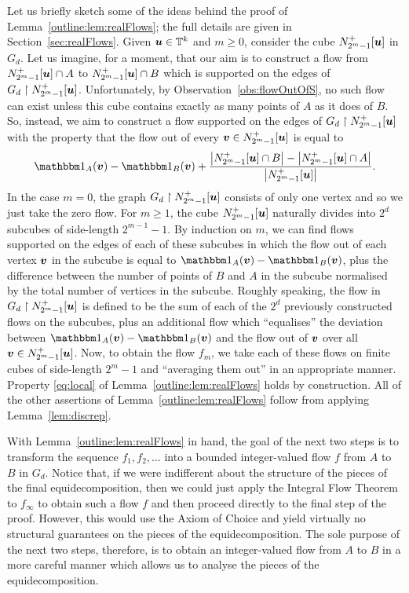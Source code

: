 \documentclass[12pt,a4paper]{amsart}
\numberwithin{equation}{section}
\theoremstyle{definition}
\begin{document}
Let us briefly sketch some of the ideas behind the proof of Lemma~\ref{outline:lem:realFlows}; the full details are given in Section~\ref{sec:realFlows}. Given $\boldsymbol{u}\in\mathbb{T}^k$ and $m\geq0$, consider the cube $N_{2^m-1}^+[\boldsymbol{u}]$ in $G_d$. Let us imagine, for a moment, that our aim is to construct a flow from $N_{2^m-1}^+[\boldsymbol{u}]\cap A$ to $N_{2^m-1}^+[\boldsymbol{u}]\cap B$ which is supported on the edges of $G_d\upharpoonright N_{2^m-1}^+[\boldsymbol{u}]$.  Unfortunately, by Observation~\ref{obs:flowOutOfS}, no such flow can exist unless this cube contains exactly as many points of $A$ as it does of $B$. So, instead, we aim to construct a flow supported on the edges of $G_d\upharpoonright N_{2^m-1}^+[\boldsymbol{u}]$ with the property that the flow out of every $\boldsymbol{v}\in N_{2^m-1}^+[\boldsymbol{u}]$ is equal to
\[\ind_A(\vvec{v}) - \ind_B(\vvec{v}) + \frac{\left|N_{2^m-1}^+[\vvec{u}]\cap B\right|-\left|N_{2^m-1}^+[\vvec{u}]\cap A\right|}{\left|N_{2^m-1}^+[\vvec{u}]\right|}.\] 
In the case $m=0$, the graph $G_d\upharpoonright N_{2^{m}-1}^+[\boldsymbol{u}]$ consists of only one vertex and so we just take the zero flow. For $m\geq1$, the cube $N^+_{2^m-1}[\boldsymbol{u}]$ naturally divides into $2^d$ subcubes of side-length $2^{m-1}-1$. By induction on $m$, we can find flows supported on the edges of each of these subcubes in which the flow out of each vertex $\boldsymbol{v}$ in the subcube is equal to $\ind_A(\vvec{v})-\ind_B(\vvec{v})$, plus the difference between the number of points of $B$ and $A$ in the subcube normalised by the total number of vertices in the subcube. Roughly speaking, the flow in $G_d\upharpoonright N^+_{2^m-1}[\boldsymbol{u}]$ is defined to be the sum of each of the $2^d$ previously constructed flows on the subcubes, plus an additional flow which ``equalises'' the deviation between $\ind_A(\vvec{v})-\ind_B(\vvec{v})$ and the flow out of $\boldsymbol{v}$ over all $\boldsymbol{v}\in N^+_{2^m-1}[\boldsymbol{u}]$. Now, to obtain the flow $f_m$, we take each of these flows on finite cubes of side-length $2^m-1$ and ``averaging them out'' in an appropriate manner. Property \eqref{eq:local} of Lemma~\ref{outline:lem:realFlows} holds by construction. All of the other assertions of Lemma~\ref{outline:lem:realFlows} follow from applying Lemma~\ref{lem:discrep}.

With Lemma~\ref{outline:lem:realFlows} in hand, the goal of the next two steps is to transform the sequence $f_1,f_2,\dots$ into a bounded integer-valued flow $f$ from $A$ to $B$ in $G_d$. Notice that, if we were indifferent about the structure of the pieces of the final equidecomposition, then we could just apply the Integral Flow Theorem to $f_\infty$ to obtain such a flow $f$ and then proceed directly to the final step of the proof. However, this would use the Axiom of Choice and yield virtually no structural guarantees on the pieces of the equidecomposition. The sole purpose of the next two steps, therefore, is to obtain an integer-valued flow from $A$ to $B$ in a more careful manner which allows us to analyse the pieces of the equidecomposition. 
\end{document}
